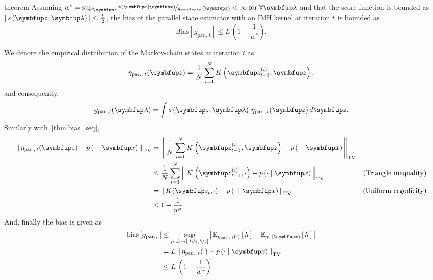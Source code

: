 
\begin{theoremEnd}{theorem}
  Assuming \(w^* = \sup_{\vz} \nicefrac{p\left(\vz\mid\vx\right)}{q_{\vlambda_{\tau}}\left(\vz\right)} < \infty \; \text{for}\;\forall \vlambda \) and that the score function is bounded as \(\left|\, s\left(\vz; \vlambda\right) \,\right| \leq \frac{L}{2}\), the bias of the parallel state estimator with an IMH kernel at iteration \(t\) is bounded as
  {\small
\[
    \mathrm{Bias}\left[ g_{\mathrm{par.,\, t}} \right] \leq L\, \left(1 - \frac{1}{w^*}\right).
\]
  }
\end{theoremEnd}
\begin{proofEnd}
  We denote the empirical distribution of the Markov-chain states at iteration \(t\) as
  \begin{align}
    \eta_{\mathrm{par.},\, t}(\vz) = \frac{1}{N} \sum_{i=1}^N K\left(\vz_{t-1}^{(i)}, \vz\right).
  \end{align}
  and consequently,
  \begin{align}
      g_{\mathrm{par.}, t}(\vlambda) = \int s\left(\vz; \vlambda\right) \, \eta_{\mathrm{par.},\, t}(\vz) \, d\vz.
  \end{align}
  Similarly with~\cref{thm:bias_seq}, 
  \begin{align}
    \DTV{ \eta_{\mathrm{par.},\, t}(\vz) }{p\left(\cdot\mid\vx\right)}
    &= \DTV{\frac{1}{N} \sum_{i=1}^N K\left(\vz_{t-1}^{(i)}, \vz\right)}{p\left(\cdot\mid\vx\right)} \\
    &\leq \frac{1}{N} \sum_{i=1}^N  \DTV{K\left(\vz_{t-1}^{(i)}, \cdot\right)}{p\left(\cdot\mid\vx\right)} &\text{(Triangle inequality)} \\
    &=    \DTV{K(\vz_t, \cdot)}{p\left(\cdot\mid\vx\right)} &\text{(Uniform ergodicity)} \\
    &\leq 1 - \frac{1}{w^*}.
  \end{align}
  And, finally the bias is given as
 \begin{align}
   \mathrm{bias}\left[ g_{\mathrm{par., t}} \right]
   &\leq \sup_{h : \mathcal{Z} \rightarrow \left[ \text{-}\nicefrac{L}{2}, \nicefrac{L}{2} \right]} \left|\, \Esub{\eta_{\mathrm{par.},\, t}(\cdot)}{h} - \Esub{p(\cdot\mid\vx)}{h} \,\right| \\
   &= L\, \DTV{ \eta_{\mathrm{par.},\, t}(\cdot) }{p\left(\cdot\mid\vx\right)}  \\
   &\leq L \, \left(1 - \frac{1}{w^*}\right)
 \end{align}
\end{proofEnd}

